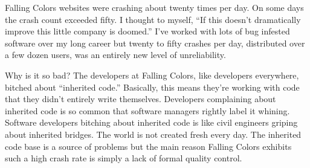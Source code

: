 \small
\begin{Shaded}
\begin{Highlighting}[]
  
         
         
         
    \NormalTok{( }    \NormalTok{(}\NormalTok{(}\NormalTok{(}\NormalTok{) } \NormalTok{) } 
                    \NormalTok{(}\NormalTok{) } 
                     
                
             \NormalTok{(}\NormalTok{(}\NormalTok{(}\NormalTok{) } \NormalTok{)}
  
\end{Highlighting}
\end{Shaded}
\normalsize

Falling Colors websites were crashing about twenty times per day. On
some days the crash count exceeded fifty. I thought to myself, ``If this
doesn't dramatically improve this little company is doomed.'' I've
worked with lots of bug infested software over my long career but twenty
to fifty crashes per day, distributed over a few dozen users, was an
entirely new level of unreliability.

Why is it so bad? The developers at Falling Colors, like developers
everywhere, bitched about ``inherited code.'' Basically, this means
they're working with code that they didn't entirely write themselves.
Developers complaining about inherited code is so common that software
managers rightly label it whining. Software developers bitching about
inherited code is like civil engineers griping about inherited bridges.
The world is not created fresh every day. The inherited code base is a
source of problems but the main reason Falling Colors exhibits such a
high crash rate is simply a lack of formal quality control.

